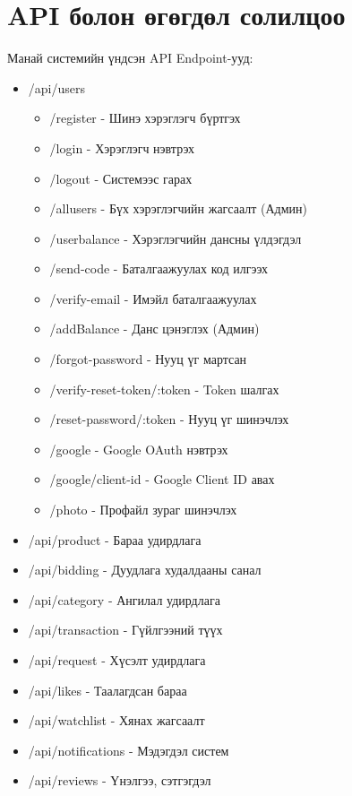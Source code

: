  \section{API болон өгөгдөл солилцоо}
 Манай системийн үндсэн API Endpoint-ууд:
  \begin{itemize}
    \item /api/users
    \begin{itemize}
        \item /register - Шинэ хэрэглэгч бүртгэх
        \item /login - Хэрэглэгч нэвтрэх
        \item /logout - Системээс гарах
        \item /allusers - Бүх хэрэглэгчийн жагсаалт (Админ)
        \item /userbalance - Хэрэглэгчийн дансны үлдэгдэл
        \item /send-code - Баталгаажуулах код илгээх
        \item /verify-email - Имэйл баталгаажуулах
        \item /addBalance - Данс цэнэглэх (Админ)
        \item /forgot-password - Нууц үг мартсан
        \item /verify-reset-token/:token - Token шалгах
        \item /reset-password/:token - Нууц үг шинэчлэх
         \item /google - Google OAuth нэвтрэх
         \item /google/client-id - Google Client ID авах
         \item /photo - Профайл зураг шинэчлэх

    \end{itemize}
    \item /api/product - Бараа удирдлага
    \item /api/bidding - Дуудлага худалдааны санал
    \item /api/category - Ангилал удирдлага
    \item /api/transaction - Гүйлгээний түүх
    \item /api/request - Хүсэлт удирдлага
    \item /api/likes - Таалагдсан бараа
    \item /api/watchlist - Хянах жагсаалт
    \item /api/notifications - Мэдэгдэл систем
    \item /api/reviews - Үнэлгээ, сэтгэгдэл
\end{itemize}

